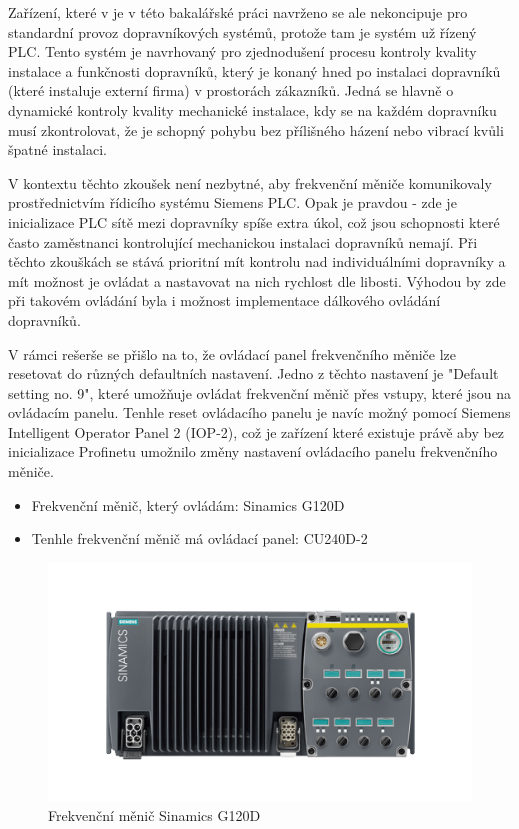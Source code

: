 Zařízení, které v je v této bakalářské práci navrženo se ale nekoncipuje pro standardní provoz dopravníkových systémů, protože tam je systém už řízený PLC. Tento systém je navrhovaný pro zjednodušení procesu kontroly kvality instalace a funkčnosti dopravníků, který je konaný hned po instalaci dopravníků (které instaluje externí firma) v prostorách zákazníků. Jedná se hlavně o dynamické kontroly kvality mechanické instalace, kdy se na každém dopravníku musí zkontrolovat, že je schopný pohybu bez přílišného házení nebo vibrací kvůli špatné instalaci. 

V kontextu těchto zkoušek není nezbytné, aby frekvenční měniče komunikovaly prostřednictvím řídicího systému Siemens PLC. Opak je pravdou - zde je inicializace PLC sítě mezi dopravníky spíše extra úkol, což jsou schopnosti které často zaměstnanci kontrolující mechanickou instalaci dopravníků nemají. Při těchto zkouškách se stává prioritní mít kontrolu nad individuálními dopravníky a mít možnost je ovládat a nastavovat na nich rychlost dle libosti. Výhodou by zde při takovém ovládání byla i možnost implementace dálkového ovládání dopravníků. 



V rámci rešerše se přišlo na to, že ovládací panel frekvenčního měniče lze resetovat do různých defaultních nastavení. Jedno z těchto nastavení je "Default setting no. 9", které umožňuje ovládat frekvenční měnič přes vstupy, které jsou na ovládacím panelu. Tenhle reset ovládacího panelu je navíc možný pomocí Siemens Intelligent Operator Panel 2 (IOP-2), což je zařízení které existuje právě aby bez inicializace Profinetu umožnilo změny nastavení ovládacího panelu frekvenčního měniče.


\begin{itemize}
    \item Frekvenční měnič, který ovládám: Sinamics G120D
    \item Tenhle frekvenční měnič má ovládací panel: CU240D-2 \cite{SiemensG120DGettingStarted}
\end{itemize}
\begin{figure}[H]
    \centering
    \includegraphics[width=0.8\linewidth]{images/Sinamics_G120D.png}
    \caption{Frekvenční měnič Sinamics G120D \cite{SinamicsG120D}}
    \label{fig:sinamics_G120D}
\end{figure}

